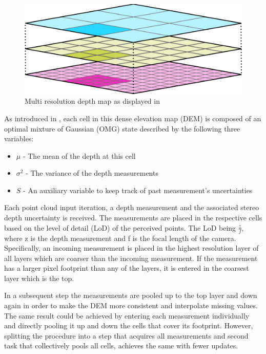 \begin{figure}[ht!]
    \centering
    \includegraphics[scale=0.25]{images/system_overview/DEM.png}
    \caption{Multi resolution depth map as displayed in \citep{LSD1}}
    \label{fig:DEM}
\end{figure}

As introduced in \citet{LSD2}, each cell in this dense elevation map (DEM) is composed of an optimal mixture of Gaussian (OMG) state described by the following three variables:

\begin{itemize}
    \item $\mu$ - The mean of the depth at this cell
    \item $\sigma^2$ - The variance of the depth measurements
    \item $S$ - An auxiliary variable to keep track of past measurement's uncertainties
\end{itemize}

Each point cloud input iteration, a depth measurement and the associated stereo depth uncertainty is received. The measurements are placed in the respective cells based on the level of detail (LoD) of the perceived points. The LoD being $\frac{z}{f}$, where z is the depth measurement and f is the focal length of the camera. Specifically, an incoming measurement is placed in the highest resolution layer of all layers which are coarser than the incoming measurement. If the measurement has a larger pixel footprint than any of the layers, it is entered in the coarsest layer which is the top.

In a subsequent step the measurements are pooled up to the top layer and down again in order to make the DEM more consistent and interpolate missing values. The same result could be achieved by entering each measurement individually and directly pooling it up and down the cells that cover its footprint. However, splitting the procedure into a step that acquires all measurements and second task that collectively pools all cells, achieves the same with fewer updates.

